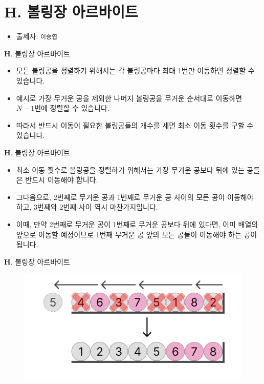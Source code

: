 \section{H. 볼링장 아르바이트}

\begin{frame} %
    \begin{itemize}
        \item 출제자: \texttt{이승엽}
    \end{itemize}
\end{frame}

\begin{frame}{\textbf{H}. 볼링장 아르바이트}
	\begin{itemize}
		\item 모든 볼링공을 정렬하기 위해서는 각 볼링공마다 최대 1번만 이동하면 정렬할 수 있습니다.
		\item 예시로 가장 무거운 공을 제외한 나머지 볼링공을 무거운 순서대로 이동하면 $N - 1$번에 정렬할 수 있습니다.
		\item 따라서 반드시 이동이 필요한 볼링공들의 개수를 세면 최소 이동 횟수를 구할 수 있습니다.
	\end{itemize}
\end{frame}

\begin{frame}{\textbf{H}. 볼링장 아르바이트}	
	\begin{itemize}
		\item 최소 이동 횟수로 볼링공을 정렬하기 위해서는 가장 무거운 공보다 뒤에 있는 공들은 반드시 이동해야 합니다.
		\item 그다음으로, 2번째로 무거운 공과 1번째로 무거운 공 사이의 모든 공이 이동해야 하고, 3번째와 2번째 사이 역시 마찬가지입니다.
		\item 이때, 만약 2번째로 무거운 공이 1번째로 무거운 공보다 뒤에 있다면, 이미 배열의 앞으로 이동할 예정이므로 1번째 무거운 공 앞의 모든 공들이 이동해야 하는 공이 됩니다.
	\end{itemize}
\end{frame}

\begin{frame}{\textbf{H}. 볼링장 아르바이트}	
	\begin{figure}[h!]
		\centering
		\includegraphics[width=0.9\linewidth]{../images/bowling-part-time/1.png}
	\end{figure}
\end{frame}

